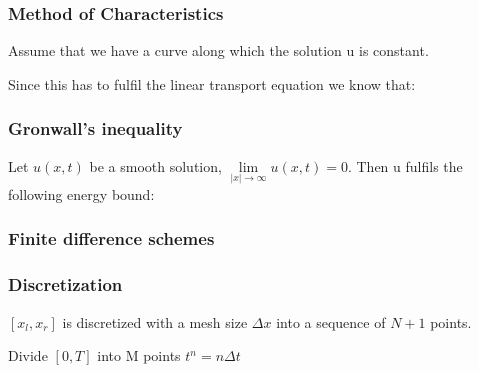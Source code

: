 \documentclass[8pt,a4paper]{scrartcl}
\begin{document}
\begin{multicols*}{3}

\subsubsection*{Method of Characteristics}

Assume that we have a curve along which the solution u is constant.




Since this has to fulfil the linear transport equation we know that:


\subsubsection*{Gronwall's inequality}




Let $u(x,t)$ be a smooth solution, $\lim\limits_{|x|\rightarrow\infty}u(x,t)=0$. Then u fulfils the following energy bound:


\subsubsection*{Finite difference schemes}

\subsubsection*{Discretization}

$[x_l,x_r]$ is discretized with a mesh size $\Delta x$ into a sequence of $N+1$ points.

Divide $[0,T]$ into M points $t^n=n\Delta t$


\end{multicols*}
\end{document}

